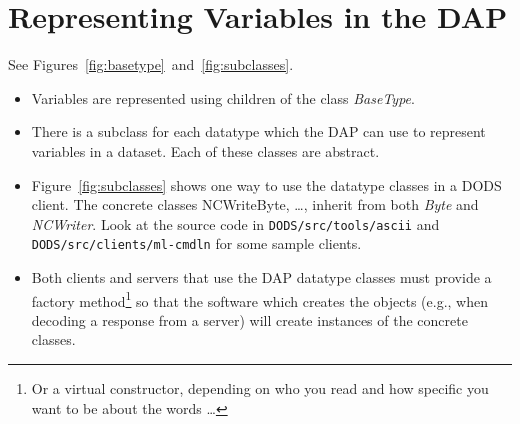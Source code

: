 \documentclass{article}
\begin{document}
\section{Representing Variables in the DAP}
\label{sec:variables}

See Figures~\ref{fig:basetype}~and~\ref{fig:subclasses}.

\begin{itemize}
\item Variables are represented using children of the class \emph{BaseType}.
  
\item There is a subclass for each datatype which the DAP can use to
  represent variables in a dataset. Each of these classes are abstract.
  
\item Figure~\ref{fig:subclasses} shows one way to use the datatype classes
  in a DODS client. The concrete classes NCWriteByte, \ldots, inherit from
  both \emph{Byte} and \emph{NCWriter}. Look at the source code in
  \texttt{DODS/\-src/\-tools/\-ascii} and
  \texttt{DODS/\-src/\-clients/\-ml-cmdln} for some sample clients.
  
\item Both clients and servers that use the DAP datatype classes must
  provide a factory method\footnote{Or a virtual constructor, depending on
    who you read and how specific you want to be about the words \ldots} so
  that the software which creates the objects (e.g., when decoding a response
  from a server) will create instances of the concrete classes.
\end{itemize}

\begin{sidewaysfigure}[h]
\begin{center}
\caption{Datatype classes. This uses the Composite pattern described by
  Gamma, \textit{et al.}}
\label{fig:basetype}
\end{center}
\end{sidewaysfigure}

\begin{sidewaysfigure}[h]
\begin{center}
\caption{Example use of the datatype classes. This shows the classes
  specialized to read data and write out the values in a NetCDF file. This is
  from a design that has not yet (11/6/2000 jhrg) been fully implemented but
  is very similar to other designs we've used in the past.}
\label{fig:subclasses}
\end{center}
\end{sidewaysfigure}
\end{document}
